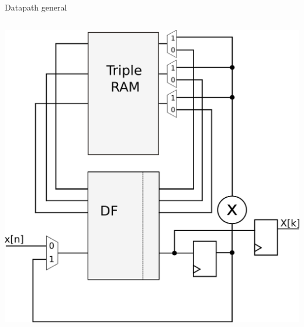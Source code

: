 \begin{frame}{Datapath general}
\begin{columns}[T]
{\begin{column}{.5\textwidth}
\begin{center}
          \includegraphics[scale=0.27]{./figures/datapathR4.png}
        \end{center}
      \end{column}
      }
  \end{columns}
      
\end{frame}

